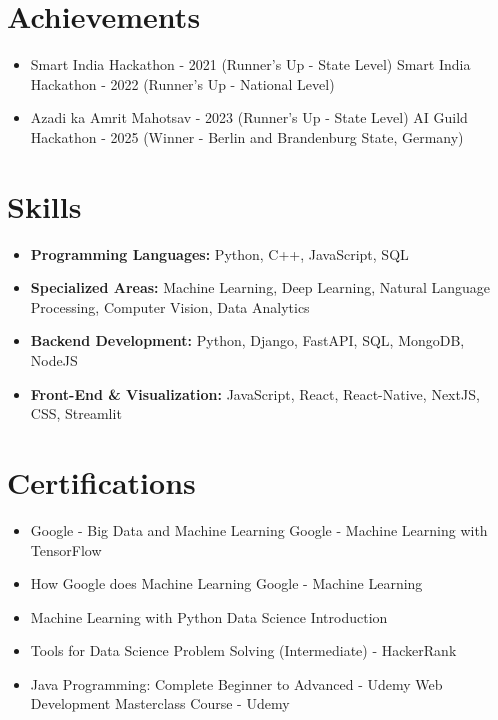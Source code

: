 \documentclass[a4paper,10pt]{article}
\begin{document}
\section*{Achievements}
\begin{itemize}
\item Smart India Hackathon - 2021 (Runner's Up - State Level) \hfill Smart India Hackathon - 2022 (Runner's Up - National Level)
\item Azadi ka Amrit Mahotsav - 2023 (Runner's Up - State Level) \hfill AI Guild Hackathon - 2025 (Winner - Berlin and Brandenburg State, Germany)
\end{itemize}

\section*{Skills}
\begin{itemize}
  \item \textbf{Programming Languages:} Python, C++, JavaScript, SQL
  \item \textbf{Specialized Areas:} Machine Learning, Deep Learning, Natural Language Processing, Computer Vision, Data Analytics
  \item \textbf{Backend Development:} Python, Django, FastAPI, SQL, MongoDB, NodeJS
  \item \textbf{Front-End \& Visualization:} JavaScript, React, React-Native, NextJS, CSS, Streamlit
\end{itemize}

\section*{Certifications}
\begin{itemize}
\item Google - Big Data and Machine Learning \hfill Google - Machine Learning with TensorFlow
\item How Google does Machine Learning \hfill Google - Machine Learning
\item Machine Learning with Python \hfill Data Science Introduction
\item Tools for Data Science \hfill Problem Solving (Intermediate) - HackerRank
\item Java Programming: Complete Beginner to Advanced - Udemy \hfill Web Development Masterclass Course - Udemy
\end{itemize}
\end{document}
